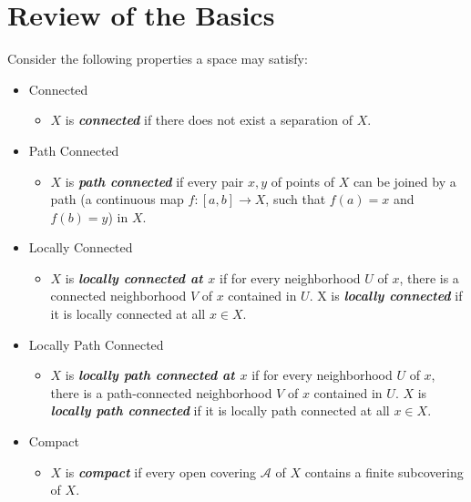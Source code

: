 \documentclass[12pt,a4paper]{article}
\begin{document}
    \newpage
    \section{Review of the Basics}
    Consider the following properties a space may satisfy:
    \begin{itemize}
        \item Connected
        \begin{itemize}
            \item $X$ is \textbf{\textit{connected}} if there does not exist a separation of $X$.
        \end{itemize}
    
        \item Path Connected
        \begin{itemize}
            \item $X$ is \textbf{\textit{path connected}} if every pair $x,y$ of points of $X$ can be joined by a path (a continuous map $f:[a,b]\to X$, such that $f(a)=x$ and $f(b)=y$) in $X$.
        \end{itemize}
    
        \item Locally Connected
        \begin{itemize}
            \item $X$ is \textbf{\textit{locally connected at $x$}} if for every neighborhood $U$ of $x$, there is a connected neighborhood $V$ of $x$ contained in $U$. X is \textbf{\textit{locally connected}} if it is locally connected at all $x\in X$.
        \end{itemize}
    
        \item Locally Path Connected
        \begin{itemize}
            \item $X$ is \textbf{\textit{locally path connected at $x$}} if for every neighborhood $U$ of $x$, there is a path-connected neighborhood $V$ of $x$ contained in $U$. $X$ is \textbf{\textit{locally path connected}} if it is locally path connected at all $x\in X$.
        \end{itemize}
    
        \item Compact
        \begin{itemize}
            \item $X$ is \textbf{\textit{compact}} if every open covering $\mathcal{A}$ of $X$ contains a finite subcovering of $X$.
        \end{itemize}
    

\end{itemize}
\end{document}
